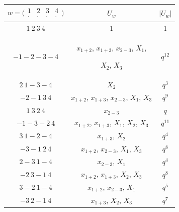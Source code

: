 \begin{center} 


\begin{tabular}{|c|c|c|} 


\hline 


$w=\big(\begin{smallmatrix} 1 & 2 & 3 & 4 \\ \cdot & \cdot & \cdot 


& \cdot\end{smallmatrix}\big)$ & $U_w$ & $|U_w|$ \\ 


\hline 


$1\ 2\ 3\ 4$ & 1 & 1\\ 


\hline 


${-}1{-}2{-}3{-}4$ & $x_{1+2}$, $x_{1+3}$, $x_{2-3}$, $X_1$, 


$X_2$, $X_3$ & $q^{12}$ \\ 


\hline 


$2 \ 1{-}3{-}4$ & $X_2$ & $q^3$ \\ 


\hline 


${-}2{-}1\ 3\ 4$ & $x_{1+2}$, $x_{1+3}$, $x_{2-3}$, $X_1$, $X_3$ 


& $q^9$ \\ 


\hline 


$1\ 3\ 2\ 4$ & $x_{2-3}$ & $q$ \\ 


\hline 


${-}1{-}3{-}2\ 4$ & $x_{1+2}$, $x_{1+3}$, $X_1$, $X_2$, $X_3$ & $q^{11}$ \\ 


\hline 


$3\ 1{-}2{-}4$ & $x_{1+3}$, $X_2$ & $q^4$ \\ 


\hline 


${-}3{-}1\ 2\ 4$ & $x_{1+2}$, $x_{2-3}$, $X_1$, $X_3$ & $q^8$\\ 


\hline 


$2{-}3\ 1{-}4$ & $x_{2-3}$, $X_1$ & $q^4$ \\ 


\hline 


${-}2\ 3{-}1\ 4$ & $x_{1+2}$, $x_{1+3}$, $X_2$, $X_3$ & $q^8$ \\ 


\hline 


$3{-}2\ 1{-}4$ & $x_{1+2}$, $x_{2-3}$, $X_1$ & $q^5$ \\ 


\hline 


${-}3\ 2{-}1\ 4$ & $x_{1+3}$, $X_2$, $X_3$ & $q^7$ \\ 


\hline 


\end{tabular} 


\end{center} 



